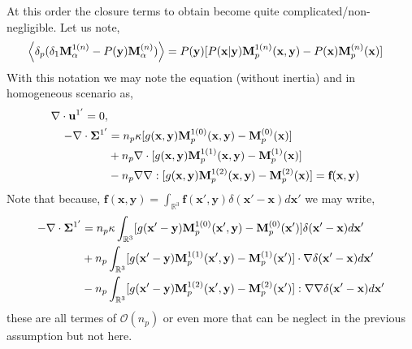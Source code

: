 \documentclass[12pt]{My_preprint}
\begin{document}
At this order the closure terms to obtain become quite complicated/non-negligible. 
Let us note, 
\begin{align}
    \left<\delta_{p} (\delta_1\textbf{M}_\alpha^{1(n)} - P(\textbf{y})\textbf{M}_\alpha^{(n)})\right>
    &=
    P(\textbf{y})[P(\textbf{x}|\textbf{y})\textbf{M}_{p}^{1(n)}(\textbf{x},\textbf{y})
    - P(\textbf{x})\textbf{M}_{p}^{(n)}(\textbf{x})]
\end{align}
With this notation we may note the equation (without inertia) and in homogeneous scenario as,
\begin{align}
     \mathbf{\nabla}\cdot \textbf{u}^{1'} = 0, \\
    -\mathbf{\nabla}\cdot \bm\Sigma^{1'}
    &= 
   n_p\kappa
   [g(\textbf{x},\textbf{y})\textbf{M}_{p}^{1(0)}(\textbf{x},\textbf{y})
    - \textbf{M}_{p}^{(0)}(\textbf{x})]\\
   &+n_p\mathbf{\nabla}\cdot [g(\textbf{x},\textbf{y})\textbf{M}_{p}^{1(1)}(\textbf{x},\textbf{y})
    - \textbf{M}_{p}^{(1)}(\textbf{x})]\\
   &-n_p\mathbf{\nabla}\mathbf{\nabla}: [g(\textbf{x},\textbf{y})\textbf{M}_{p}^{1(2)}(\textbf{x},\textbf{y})
    - \textbf{M}_{p}^{(2)}(\textbf{x})] = \textbf{f}(\textbf{x},\textbf{y})\\
\end{align}
Note that because, $\textbf{f}(\textbf{x},\textbf{y})= \int_{\mathbb{R}^3} \textbf{f}(\textbf{x}',\textbf{y})\delta(\textbf{x}'-\textbf{x})d\textbf{x}' $ we may write,
\begin{align}
    -\mathbf{\nabla}\cdot \bm\Sigma^{1'}
    &= 
   n_p\kappa
   \int_{\mathbb{R}^3}
   [g(\textbf{x}'-\textbf{y})\textbf{M}_{p}^{1(0)}(\textbf{x}',\textbf{y})
    - \textbf{M}_{p}^{(0)}(\textbf{x}')]
    \delta(\textbf{x}' - \textbf{x}) 
    d\textbf{x}'\\
   &+ 
   n_p\int_{\mathbb{R}^3}
   [g(\textbf{x}'-\textbf{y})\textbf{M}_{p}^{1(1)}(\textbf{x}',\textbf{y})
    - \textbf{M}_{p}^{(1)}(\textbf{x}')]
    \cdot \mathbf{\nabla}\delta(\textbf{x}' - \textbf{x}) 
    d\textbf{x}'\\
   &-
   n_p\int_{\mathbb{R}^3}
   [g(\textbf{x}'-\textbf{y})\textbf{M}_{p}^{1(2)}(\textbf{x}',\textbf{y})
    - \textbf{M}_{p}^{(2)}(\textbf{x}')]
    : \mathbf{\nabla}\mathbf{\nabla}\delta(\textbf{x}' - \textbf{x}) 
    d\textbf{x}'
\end{align}
these are all termes of $\mathcal{O}(n_p)$ or even more that can be neglect in the previous assumption but not here.
\end{document}
